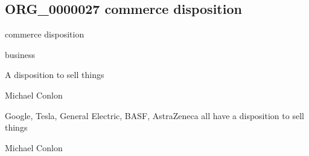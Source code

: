\documentclass[letterpaper,10pt,english]{sphinxmanual}
\begin{document}
\subsection{ORG\_0000027 \sphinxhyphen{} commerce disposition}
\label{\detokenize{doc-ORG_0000027:org-0000027-commerce-disposition}}\label{\detokenize{doc-ORG_0000027:index-0}}\label{\detokenize{doc-ORG_0000027::doc}}
\begin{sphinxShadowBox}

\sphinxAtStartPar
commerce disposition
\end{sphinxShadowBox}

\begin{sphinxShadowBox}

\sphinxAtStartPar
business
\end{sphinxShadowBox}

\begin{sphinxShadowBox}

\sphinxAtStartPar
{\hyperref[\detokenize{doc-BFO_0000016::doc}]{}}
\end{sphinxShadowBox}

\begin{sphinxShadowBox}

\sphinxAtStartPar
A disposition to sell things
\end{sphinxShadowBox}

\begin{sphinxShadowBox}

\sphinxAtStartPar
Michael Conlon 
\end{sphinxShadowBox}

\begin{sphinxShadowBox}

\sphinxAtStartPar
Google, Tesla, General Electric, BASF, AstraZeneca all have a disposition to sell things
\end{sphinxShadowBox}

\begin{sphinxShadowBox}

\sphinxAtStartPar
Michael Conlon 
\end{sphinxShadowBox}
\begin{quote}

\ignorespaces \end{quote}
\end{document}
